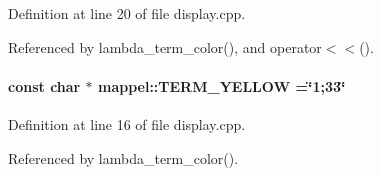 Definition at line 20 of file display.\+cpp.



Referenced by lambda\+\_\+term\+\_\+color(), and operator$<$$<$().

\paragraph[{\texorpdfstring{T\+E\+R\+M\+\_\+\+Y\+E\+L\+L\+OW}{TERM_YELLOW}}]{\setlength{\rightskip}{0pt plus 5cm}const char $\ast$ mappel\+::\+T\+E\+R\+M\+\_\+\+Y\+E\+L\+L\+OW =\char`\"{}1;33\char`\"{}}\hypertarget{namespacemappel_ae85ff1ec27541515a29ca8b7301866dd}{}\label{namespacemappel_ae85ff1ec27541515a29ca8b7301866dd}


Definition at line 16 of file display.\+cpp.



Referenced by lambda\+\_\+term\+\_\+color().

